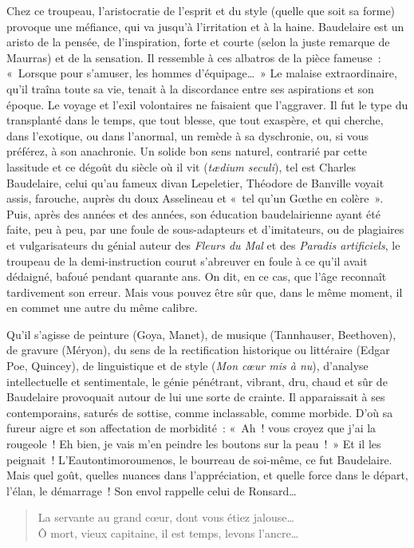 \documentclass[french,twoside]{book} %
\begin{document}
Chez ce troupeau, l’aristocratie de l’esprit et du style (quelle que soit sa forme) provoque une méfiance, qui va jusqu’à l’irritation et à la haine. Baudelaire est un aristo de la pensée, de l’inspiration, forte et courte (selon la juste remarque de Maurras) et de la sensation. Il ressemble à ces albatros de la pièce fameuse : « Lorsque pour s’amuser, les hommes d’équipage… » Le malaise extraordinaire, qu’il traîna toute sa vie, tenait à la discordance entre ses aspirations et son époque. Le voyage et l’exil volontaires ne faisaient que l’aggraver. Il fut le type du transplanté dans le temps, que tout blesse, que tout exaspère, et qui cherche, dans l’exotique, ou dans l’anormal, un remède à sa dyschronie, ou, si vous préférez, à son anachronie. Un solide bon sens naturel, contrarié par cette lassitude et ce dégoût du siècle où il vit ({\itshape tædium seculi}), tel est Charles Baudelaire, celui qu’au fameux divan Lepeletier, Théodore de Banville voyait assis, farouche, auprès du doux Asselineau et « tel qu’un Gœthe en colère ». Puis, après des années et des années, son éducation baudelairienne ayant été faite, peu à peu, par une foule de sous-adapteurs et d’imitateurs, ou de plagiaires et vulgarisateurs du génial auteur des {\itshape Fleurs du Mal} et des {\itshape Paradis artificiels}, le troupeau de la demi-instruction courut s’abreuver en foule à ce qu’il avait dédaigné, bafoué pendant quarante ans. On dit, en ce cas, que l’âge reconnaît tardivement son erreur. Mais vous pouvez être sûr que, dans le même moment, il en commet une autre du même calibre.\par
Qu’il s’agisse de peinture (Goya, Manet), de musique (Tannhauser, Beethoven), de gravure (Méryon), du sens de la rectification historique ou littéraire (Edgar Poe, Quincey), de linguistique et de style ({\itshape Mon cœur mis à nu}), d’analyse intellectuelle et sentimentale, le génie pénétrant, vibrant, dru, chaud et sûr de Baudelaire provoquait autour de lui une sorte de crainte. Il apparaissait à ses contemporains, saturés de sottise, comme inclassable, comme morbide. D’où sa fureur aigre et son affectation de morbidité : « Ah ! vous croyez que j’ai la rougeole ! Eh bien, je vais m’en peindre les boutons sur la peau ! » Et il les peignait ! L’Eautontimoroumenos, le bourreau de soi-même, ce fut Baudelaire. Mais quel goût, quelles nuances dans l’appréciation, et quelle force dans le départ, l’élan, le démarrage ! Son envol rappelle celui de Ronsard…\par


\begin{verse}
La servante au grand cœur, dont vous étiez jalouse…\\
Ô mort, vieux capitaine, il est temps, levons l’ancre…\\
\end{verse}
\end{document}
